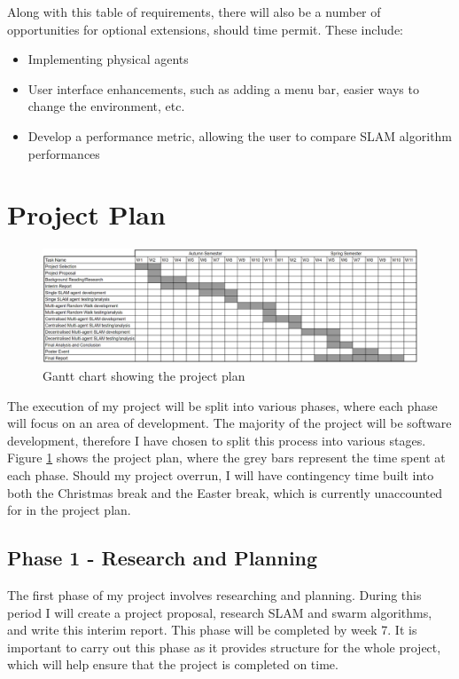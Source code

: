 \documentclass[12pt]{article}
\begin{document}
Along with this table of requirements, there will also be a number of opportunities for optional extensions, should time permit.
These include:
\begin{itemize}
    \item Implementing physical agents
    \item User interface enhancements, such as adding a menu bar, easier ways to change the environment, etc.
    \item Develop a performance metric, allowing the user to compare SLAM algorithm performances
\end{itemize}

\section{Project Plan}
\begin{figure}[H]
    \centering
    \includegraphics[width=0.8\linewidth]{gantt_chart.png}
    \caption{Gantt chart showing the project plan}
    \label{fig:gantt_chart}
\end{figure}
The execution of my project will be split into various phases, where each phase will focus on an area of development. The
majority of the project will be software development, therefore I have chosen to split this process into various stages. Figure
\ref{fig:gantt_chart} shows the project plan, where the grey bars represent the time spent at each phase. Should my project
overrun, I will have contingency time built into both the Christmas break and the Easter break, which is currently unaccounted
for in the project plan.\\

\subsection{Phase 1 - Research and Planning}
The first phase of my project involves researching and planning. During this period I will create a project proposal,
research SLAM and swarm algorithms, and write this interim report. This phase will be completed by week 7. It is important
to carry out this phase as it provides structure for the whole project, which will help ensure that the project is completed
on time.
\end{document}
